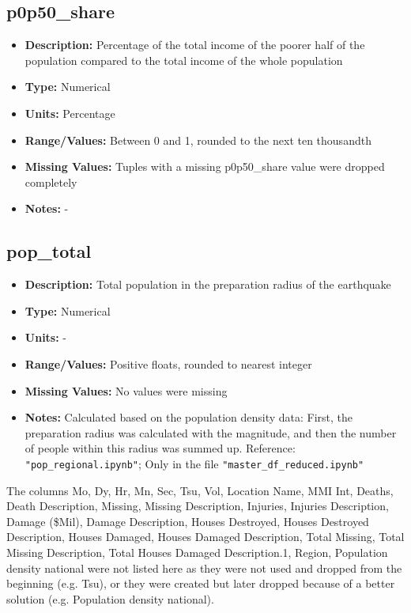 \documentclass[a4paper]{article}
\begin{document}
\subsection{p0p50\_share}
\begin{itemize}
    \item \textbf{Description:} Percentage of the total income of the poorer half of the population compared to the total income of the whole population
    \item \textbf{Type:} Numerical
    \item \textbf{Units:} Percentage
    \item \textbf{Range/Values:} Between 0 and 1, rounded to the next ten thousandth
    \item \textbf{Missing Values:} Tuples with a missing p0p50\_share value were dropped completely
    \item \textbf{Notes:} -
\end{itemize}

\subsection{pop\_total}
\begin{itemize}
    \item \textbf{Description:} Total population in the preparation radius of the earthquake
    \item \textbf{Type:} Numerical
    \item \textbf{Units:} -
    \item \textbf{Range/Values:} Positive floats, rounded to nearest integer
    \item \textbf{Missing Values:} No values were missing
    \item \textbf{Notes:} Calculated based on the population density data: First, the preparation radius was calculated with the magnitude, and then the number of people within this radius was summed up. Reference: \lstinline{"pop_regional.ipynb"}; 
    Only in the file \lstinline{"master_df_reduced.ipynb"}
\end{itemize}

The columns Mo, Dy, Hr, Mn, Sec, Tsu, Vol, Location Name, MMI Int, Deaths, Death Description, Missing, Missing Description, Injuries, Injuries Description, Damage (\$Mil), Damage Description, Houses Destroyed, Houses Destroyed Description, Houses Damaged, Houses Damaged Description, Total Missing, Total Missing Description, Total Houses Damaged Description.1, Region, Population density national were not listed here as they were not used and dropped from the beginning (e.g. Tsu), or they were created but later dropped because of a better solution (e.g. Population density national).
\end{document}
